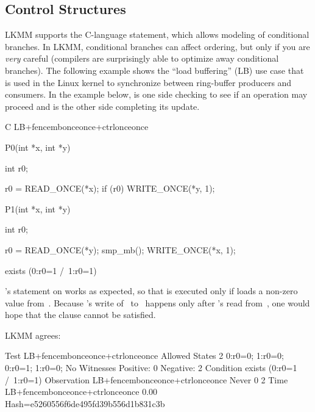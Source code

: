 \subsection{Control Structures}

LKMM supports the C-language  statement, which allows modeling of
conditional branches.
In LKMM, conditional branches can affect ordering, but only if you are
\emph{very} careful (compilers are surprisingly able to optimize away
conditional branches).
The following example shows the ``load buffering'' (LB) use case that is
used in the Linux kernel to synchronize between ring-buffer producers and
consumers.
In the example below,  is one side checking to see if an operation
may proceed and  is the other side completing its update.

\begin{fcvlabel}
\begin{VerbatimN}[commandchars=\%\@\$]
	C LB+fencembonceonce+ctrlonceonce

	{}

	P0(int *x, int *y)
	{
		int r0;

		r0 = READ_ONCE(*x);         %
		if (r0)                     %
			WRITE_ONCE(*y, 1);  %
	}

	P1(int *x, int *y)
	{
		int r0;

		r0 = READ_ONCE(*y);
		smp_mb();
		WRITE_ONCE(*x, 1);
	}

	exists (0:r0=1 /\ 1:r0=1)      %
\end{VerbatimN}
\end{fcvlabel}

\begin{fcvref}
's  statement on  works as expected, so that
 is executed only if  loads a non-zero value
from~.
Because 's write of~ to~ happens only after
's read from~, one would hope that the  clause
cannot be satisfied.
\end{fcvref}
LKMM agrees:

\begin{VerbatimN}
	Test LB+fencembonceonce+ctrlonceonce Allowed
	States 2
	0:r0=0; 1:r0=0;
	0:r0=1; 1:r0=0;
	No
	Witnesses
	Positive: 0 Negative: 2
	Condition exists (0:r0=1 /\ 1:r0=1)
	Observation LB+fencembonceonce+ctrlonceonce Never 0 2
	Time LB+fencembonceonce+ctrlonceonce 0.00
	Hash=e5260556f6de495fd39b556d1b831c3b
\end{VerbatimN}

